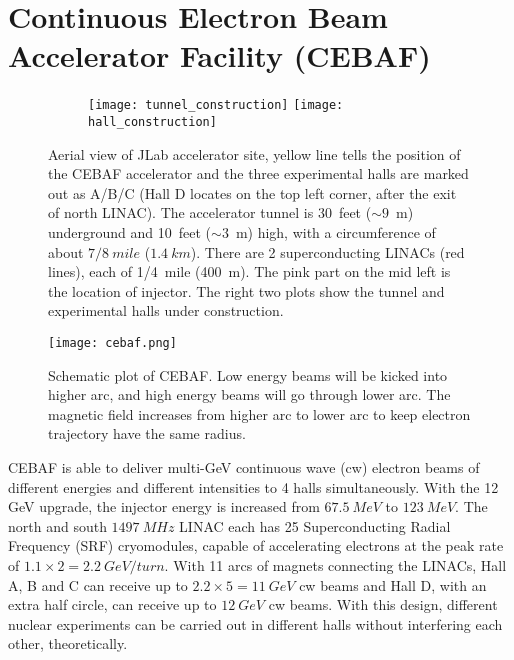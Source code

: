\section{Continuous Electron Beam Accelerator Facility (CEBAF)}
\begin{figure}[h!]
    \begin{subfigure}[b]{0.59\textwidth}
    \end{subfigure}
    \begin{subfigure}[b]{0.5\textwidth}
	\texttt{[image: tunnel\_construction]}
	\texttt{[image: hall\_construction]}
    \end{subfigure}

    \caption{Aerial view of JLab accelerator site, yellow line tells the position
    of the CEBAF accelerator and the three experimental halls are marked out as A/B/C 
    (Hall D locates on the top left corner, after the exit of north LINAC).
    The accelerator tunnel is 30~feet ($\sim 9$~m) underground and 10~feet ($\sim 3$~m) 
    high, with a circumference of about $7/8\ mile$ ($1.4\ km$). There are 2 superconducting 
    LINACs (red lines), each of 1/4~mile (400~m). The pink part on the mid
    left is the location of injector. The right two plots show the tunnel and 
    experimental halls under construction.}
\end{figure}

\begin{figure}[h!]
    \texttt{[image: cebaf.png]}
    \caption{Schematic plot of CEBAF. Low energy beams will be kicked into 
    higher arc, and high energy beams will go through lower arc. The magnetic
    field increases from higher arc to lower arc to keep electron trajectory 
    have the same radius.}
    \label{fig:cebaf}
\end{figure}
CEBAF is able to deliver multi-GeV continuous wave (cw) electron beams of different
energies and different intensities to 4 halls simultaneously.
With the 12 GeV upgrade, the injector energy is increased from $67.5\ MeV$ to 
$123\ MeV$. The north and south $1497\ MHz$ LINAC each has 25 
Superconducting Radial Frequency (SRF) cryomodules, capable of accelerating 
electrons at the peak rate of $1.1 \times 2 = 2.2\ GeV/turn$. With 11 arcs of magnets
connecting the LINACs, Hall A, B and C can receive up
to $2.2 \times 5 = 11 \ GeV$ cw beams and Hall D, with an extra half circle,
can receive up to $12\ GeV$ cw beams. With this design, different nuclear 
experiments can be carried out in different halls without interfering each other,
theoretically.

